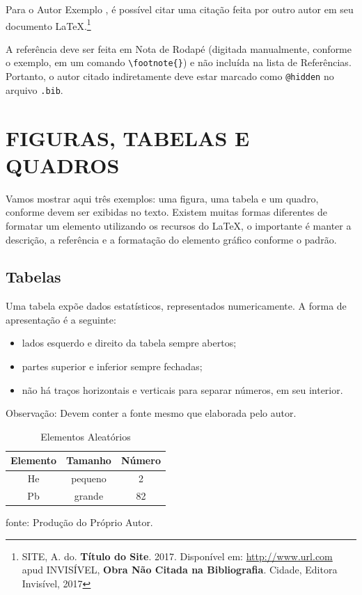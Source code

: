 \documentclass[
  12pt,		%
  a4paper,	%
  openright,%
  oneside,	%
  chapter=TITLE,		%
  section=TITLE,		%
  english,	%
  french,	%
  spanish,	%
  brazil	%
]{abntex2}
\begin{document}
            Para o Autor Exemplo , é possível citar uma citação feita por outro autor em seu documento \LaTeX.\footnote{SITE, A. do. \textbf{Título do Site}. 2017. Disponível em: \url{http://www.url.com} apud INVISÍVEL, \textbf{Obra Não Citada na Bibliografia}. Cidade, Editora Invisível, 2017}
            
            A referência deve ser feita em Nota de Rodapé (digitada manualmente, conforme o exemplo, em um comando \verb|\footnote{}|) e não incluída na lista de Referências. Portanto, o autor citado indiretamente deve estar marcado como \verb|@hidden| no arquivo \verb|.bib|. 
             
        \section{FIGURAS, TABELAS E QUADROS}
        
            Vamos mostrar aqui três exemplos: uma figura, uma tabela e um quadro, conforme devem ser exibidas no texto. Existem muitas formas diferentes de formatar um elemento utilizando os recursos do \LaTeX, o importante é manter a descrição, a referência e a formatação do elemento gráfico conforme o padrão.
            
            \subsection {Tabelas}
                Uma tabela expõe dados estatísticos, representados numericamente. A forma de apresentação é a seguinte: 
                \begin{itemize}
                    \item lados esquerdo e direito da tabela sempre abertos;
                    \item partes superior e inferior sempre fechadas;
                    \item não há traços horizontais e verticais para separar números, em seu interior.
                \end{itemize}
                
                Observação: Devem conter a fonte mesmo que elaborada pelo autor.
                
                \begin{table}[h]
                    \centering
                    \caption{Elementos Aleatórios}
                    \begin{tabular}{ccc}
                        \hline
                        \multicolumn{1}{|c|}{Elemento} & \multicolumn{1}{c|}{Tamanho} & \multicolumn{1}{c|}{Número}\\
                        \hline
                        He & pequeno & 2 \\
                        Pb & grande & 82 \\
                        \hline
                    \end{tabular}
                    \par
                    {\small fonte: Produção do Próprio Autor.}
                \end{table}
            
\end{document}
